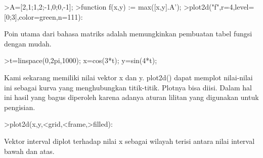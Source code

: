\documentclass{article}
\begin{document}
\begin{eulernotebook}
\begin{eulercomment}
\begin{eulercomment}
\begin{eulercomment}
\begin{eulercomment}
\begin{eulercomment}
\begin{eulercomment}
\begin{eulerprompt}
>A=[2,1;1,2;-1,0;0,-1];
>function f(x,y) := max([x,y].A');
>plot2d("f",r=4,level=[0;3],color=green,n=111):
\end{eulerprompt}
\begin{eulercomment}
Poin  utama  dari  bahasa  matriks  adalah  memungkinkan  pembuatan
tabel  fungsi  dengan  mudah.
\end{eulercomment}
\begin{eulerprompt}
>t=linspace(0,2pi,1000); x=cos(3*t); y=sin(4*t);
\end{eulerprompt}
\begin{eulercomment}
Kami  sekarang  memiliki  nilai  vektor  x  dan  y.  plot2d()  dapat
memplot  nilai-nilai  ini  sebagai  kurva  yang  menghubungkan
titik-titik.  Plotnya  bisa  diisi.  Dalam  hal  ini  hasil  yang
bagus  diperoleh  karena  adanya  aturan  lilitan  yang  digunakan
untuk pengisian.
\end{eulercomment}
\begin{eulerprompt}
>plot2d(x,y,<grid,<frame,>filled):
\end{eulerprompt}
\begin{eulercomment}
Vektor  interval  diplot  terhadap  nilai  x  sebagai  wilayah  terisi
antara  nilai  interval  bawah  dan  atas.


\end{eulercomment}
\end{eulercomment}
\end{eulercomment}
\end{eulercomment}
\end{eulercomment}
\end{eulercomment}
\end{eulercomment}
\end{eulernotebook}
\end{document}
